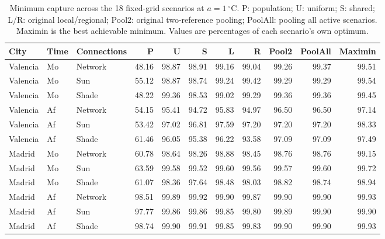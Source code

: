 \begin{table}[htbp]\centering\scriptsize
\caption{Minimum capture across the 18 fixed-grid scenarios at $a=1~^\circ$C. P: population; U: uniform; S: shared; L/R: original local/regional; Pool2: original two-reference pooling; PoolAll: pooling all active scenarios. Maximin is the best achievable minimum. Values are percentages of each scenario's own optimum.}\label{tab:fixedbaselines}
\setlength{\tabcolsep}{3pt}\begin{tabular}{lllrrrrrrrr}\toprule
City & Time & Connections & P & U & S & L & R & Pool2 & PoolAll & Maximin\\\midrule
Valencia & Mo & Network & 48.16 & 98.87 & 98.91 & 99.16 & 99.04 & 99.26 & 99.37 & 99.51\\
Valencia & Mo & Sun & 55.12 & 98.87 & 98.74 & 99.24 & 99.42 & 99.29 & 99.29 & 99.54\\
Valencia & Mo & Shade & 48.22 & 99.36 & 98.53 & 99.02 & 99.29 & 99.36 & 99.36 & 99.45\\
Valencia & Af & Network & 54.15 & 95.41 & 94.72 & 95.83 & 94.97 & 96.50 & 96.50 & 97.14\\
Valencia & Af & Sun & 53.42 & 97.02 & 96.81 & 97.59 & 97.20 & 97.20 & 97.20 & 98.33\\
Valencia & Af & Shade & 61.46 & 96.05 & 95.38 & 96.22 & 93.58 & 97.09 & 97.09 & 97.49\\
Madrid & Mo & Network & 60.78 & 98.64 & 98.26 & 98.88 & 98.45 & 98.76 & 98.76 & 99.15\\
Madrid & Mo & Sun & 63.59 & 99.58 & 99.52 & 99.60 & 99.56 & 99.57 & 99.60 & 99.72\\
Madrid & Mo & Shade & 61.07 & 98.36 & 97.64 & 98.48 & 98.03 & 98.82 & 98.74 & 98.94\\
Madrid & Af & Network & 98.51 & 99.89 & 99.92 & 99.90 & 99.87 & 99.90 & 99.90 & 99.93\\
Madrid & Af & Sun & 97.77 & 99.86 & 99.86 & 99.85 & 99.80 & 99.89 & 99.90 & 99.90\\
Madrid & Af & Shade & 98.74 & 99.90 & 99.91 & 99.85 & 99.83 & 99.90 & 99.90 & 99.93\\\bottomrule\end{tabular}\end{table}